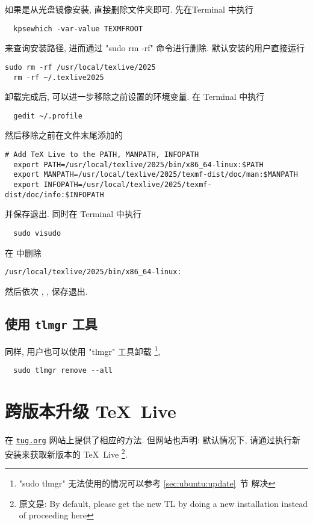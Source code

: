 如果是从光盘镜像安装,
直接删除文件夹即可.
先在\textsf{Terminal} 中执行
\begin{lstlisting}
  kpsewhich -var-value TEXMFROOT
\end{lstlisting}
来查询安装路径,
进而通过 "sudo rm -rf" 命令进行删除.
默认安装的用户直接运行
\begin{lstlisting}[deletekeywords = local]
  sudo rm -rf /usr/local/texlive/2025
  rm -rf ~/.texlive2025
\end{lstlisting}
卸载完成后, 可以进一步移除之前设置的环境变量.
在 \textsf{Terminal} 中执行
\begin{lstlisting}
  gedit ~/.profile
\end{lstlisting}
然后移除之前在文件末尾添加的
\begin{lstlisting}[deletekeywords = local]
  # Add TeX Live to the PATH, MANPATH, INFOPATH
  export PATH=/usr/local/texlive/2025/bin/x86_64-linux:$PATH
  export MANPATH=/usr/local/texlive/2025/texmf-dist/doc/man:$MANPATH
  export INFOPATH=/usr/local/texlive/2025/texmf-dist/doc/info:$INFOPATH
\end{lstlisting}
并保存退出.
同时在 \textsf{Terminal} 中执行
\begin{lstlisting}
  sudo visudo
\end{lstlisting}
在  中删除
\begin{lstlisting}[deletekeywords = local]
  /usr/local/texlive/2025/bin/x86_64-linux:
\end{lstlisting}
然后依次 , , \keys{\enter} 保存退出.

\subsection{使用 \texttt{tlmgr} 工具}

同样,
用户也可以使用 "tlmgr" 工具卸载%
\footnote{"sudo tlmgr" 无法使用的情况可以参考 \ref{sec:ubuntu:update}~节 解决},
\begin{lstlisting}
  sudo tlmgr remove --all
\end{lstlisting}

\section{跨版本升级 \TeX~Live}\label{sec:ubuntu:version}

在 \href{https://www.tug.org/texlive/upgrade.html}{\texttt{tug.org}}
网站上提供了相应的方法.
但网站也声明:
默认情况下,
请通过执行新安装来获取新版本的 \TeX~Live%
\footnote{原文是: By default,
  please get the new TL by doing a new installation instead of proceeding here}.
